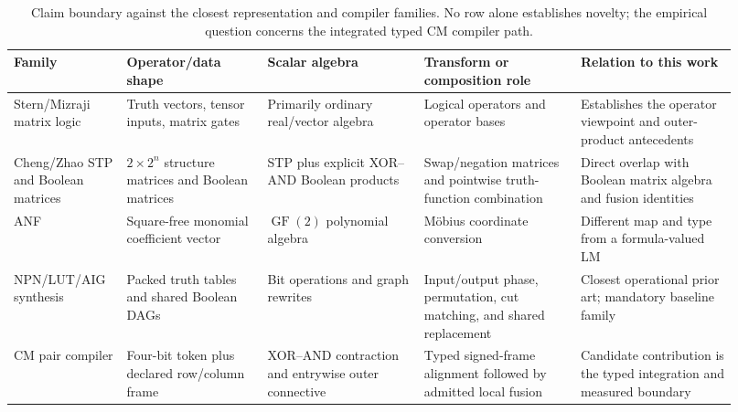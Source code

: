 \documentclass[11pt]{article}
\newcommand{\GFtwo}{\operatorname{GF}(2)}
\begin{document}
{\begin{table}[H]
  \centering
  \scriptsize
  \setlength{\tabcolsep}{3pt}
  \begin{tabular}{@{}L{0.14\linewidth}L{0.18\linewidth}L{0.20\linewidth}L{0.20\linewidth}L{0.20\linewidth}@{}}
    \toprule
    Family & Operator/data shape & Scalar algebra & Transform or composition role & Relation to this work \\
    \midrule
    Stern/Mizraji matrix logic & Truth vectors, tensor inputs, matrix gates & Primarily ordinary real/vector algebra & Logical operators and operator bases & Establishes the operator viewpoint and outer-product antecedents \\
    Cheng/Zhao STP and Boolean matrices & $2\times2^n$ structure matrices and Boolean matrices & STP plus explicit XOR--AND Boolean products & Swap/negation matrices and pointwise truth-function combination & Direct overlap with Boolean matrix algebra and fusion identities \\
    ANF & Square-free monomial coefficient vector & $\GFtwo$ polynomial algebra & M\"obius coordinate conversion & Different map and type from a formula-valued LM \\
    NPN/LUT/AIG synthesis & Packed truth tables and shared Boolean DAGs & Bit operations and graph rewrites & Input/output phase, permutation, cut matching, and shared replacement & Closest operational prior art; mandatory baseline family \\
    CM pair compiler & Four-bit token plus declared row/column frame & XOR--AND contraction and entrywise outer connective & Typed signed-frame alignment followed by admitted local fusion & Candidate contribution is the typed integration and measured boundary \\
    \bottomrule
  \end{tabular}
  \caption{Claim boundary against the closest representation and compiler
  families. No row alone establishes novelty; the empirical question concerns
  the integrated typed CM compiler path.}
  \label{tab:related-work-boundary}
\end{table}

}
\end{document}
